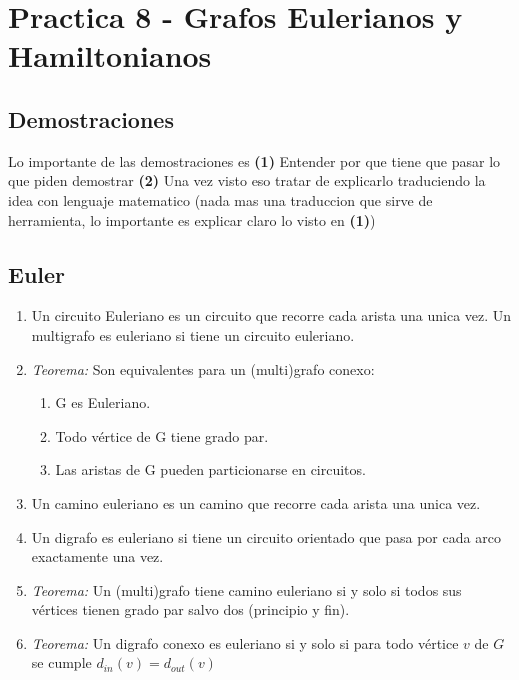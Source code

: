 \section{Practica 8 - Grafos Eulerianos y Hamiltonianos}
\subsection{Demostraciones}
Lo importante de las demostraciones es \textbf{(1)} Entender por que tiene que pasar lo que piden demostrar \textbf{(2)} Una vez visto eso tratar de explicarlo traduciendo la idea con lenguaje matematico (nada mas una traduccion que sirve de herramienta, lo importante es explicar claro lo visto en \textbf{(1)})

\subsection{Euler}
\begin{enumerate}
\item Un circuito Euleriano es un circuito que recorre cada arista una unica vez. Un multigrafo es euleriano si tiene un circuito euleriano.
\item \textit{Teorema:} Son equivalentes para un (multi)grafo conexo:
   \begin{enumerate}
   \item G es Euleriano.
   \item Todo vértice de G tiene grado par.
   \item Las aristas de G pueden particionarse en circuitos.
   \end{enumerate}
\item Un camino euleriano es un camino que recorre cada arista una unica vez.
\item Un digrafo es euleriano si tiene un circuito orientado que pasa por cada arco exactamente una vez.
\item \textit{Teorema:} Un (multi)grafo tiene camino euleriano si y solo si todos sus vértices tienen grado par salvo dos (principio y fin).
\item \textit{Teorema:} Un digrafo conexo es euleriano si y solo si para todo vértice $v$ de $G$ se cumple $d_{in}(v) = d_{out}(v)$
\end{enumerate}

